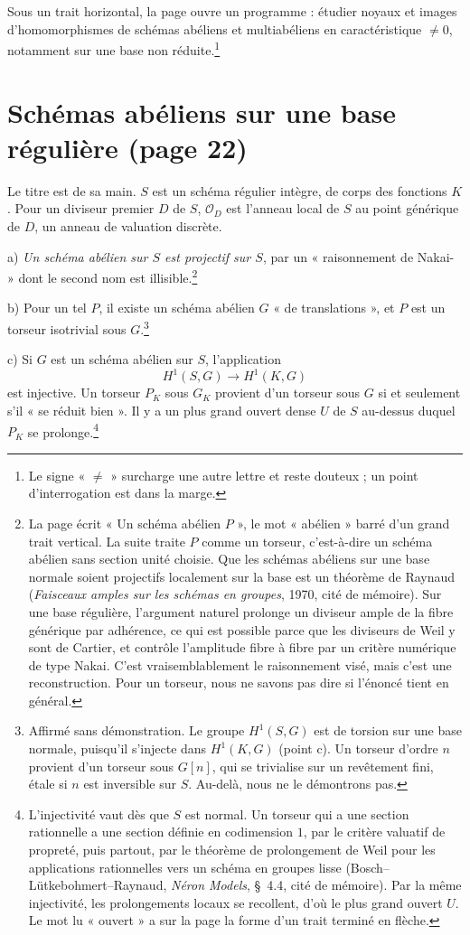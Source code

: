 \documentclass[11pt,a4paper]{article}
\begin{document}
Sous un trait horizontal, la page ouvre un programme : étudier noyaux et
images d'homomorphismes de schémas abéliens et multiabéliens en
caractéristique $\neq 0$, notamment sur une base non réduite.\footnote{Le signe
« $\neq$ » surcharge une autre lettre et reste douteux ; un point
d'interrogation est dans la marge.}

\section*{Schémas abéliens sur une base régulière (page 22)}

Le titre est de sa main. $S$ est un schéma régulier intègre, de corps des
fonctions $K$. Pour un diviseur premier $D$ de $S$, $\mathcal{O}_D$ est
l'anneau local de $S$ au point générique de $D$, un anneau de valuation
discrète.

a) \emph{Un schéma abélien sur $S$ est projectif sur $S$}, par un « raisonnement
de Nakai- » dont le second nom est illisible.\footnote{La page écrit « Un
schéma abélien $P$ », le mot « abélien » barré d'un grand trait vertical. La
suite traite $P$ comme un torseur, c'est-à-dire un schéma abélien sans section
unité choisie. Que les schémas abéliens sur une base normale soient projectifs
localement sur la base est un théorème de Raynaud (\emph{Faisceaux amples sur
les schémas en groupes}, 1970, cité de mémoire). Sur une base régulière,
l'argument naturel prolonge un diviseur ample de la fibre générique par
adhérence, ce qui est possible parce que les diviseurs de Weil y sont de
Cartier, et contrôle l'amplitude fibre à fibre par un critère numérique de type
Nakai. C'est vraisemblablement le raisonnement visé, mais c'est une
reconstruction. Pour un torseur, nous ne savons pas dire si l'énoncé tient en
général.}

b) Pour un tel $P$, il existe un schéma abélien $G$ « de translations », et $P$
est un torseur isotrivial sous $G$.\footnote{Affirmé sans démonstration. Le
groupe $H^{1}(S, G)$ est de torsion sur une base normale, puisqu'il s'injecte
dans $H^{1}(K, G)$ (point c). Un torseur d'ordre $n$ provient d'un torseur sous
$G[n]$, qui se trivialise sur un revêtement fini, étale si $n$ est inversible
sur $S$. Au-delà, nous ne le démontrons pas.}

c) Si $G$ est un schéma abélien sur $S$, l'application
\[
  H^{1}(S, G) \longrightarrow H^{1}(K, G)
\]
est injective. Un torseur $P_K$ sous $G_K$ provient d'un torseur sous $G$ si et
seulement s'il « se réduit bien ». Il y a un plus grand ouvert dense $U$ de $S$
au-dessus duquel $P_K$ se prolonge.\footnote{L'injectivité vaut dès que $S$ est
normal. Un torseur qui a une section rationnelle a une section définie en
codimension $1$, par le critère valuatif de propreté, puis partout, par le
théorème de prolongement de Weil pour les applications rationnelles vers un
schéma en groupes lisse (Bosch--Lütkebohmert--Raynaud, \emph{Néron Models},
§~4.4, cité de mémoire). Par la même injectivité, les prolongements locaux se
recollent, d'où le plus grand ouvert $U$. Le mot lu « ouvert » a sur la page la
forme d'un trait terminé en flèche.}
\end{document}
